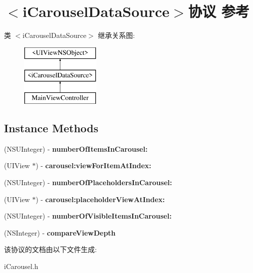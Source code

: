 \hypertarget{protocoli_carousel_data_source-p}{\section{$<$i\-Carousel\-Data\-Source$>$协议 参考}
\label{protocoli_carousel_data_source-p}
}
类 $<$i\-Carousel\-Data\-Source$>$ 继承关系图\-:\begin{figure}[H]
\begin{center}
\leavevmode
\includegraphics[height=3.000000cm]{protocoli_carousel_data_source-p}
\end{center}
\end{figure}
\subsection*{Instance Methods}
\begin{DoxyCompactItemize}
\item 
\hypertarget{protocoli_carousel_data_source-p_a2122722fbd3c539fc48607c66e21a1c7}{(N\-S\-U\-Integer) -\/ {\bfseries number\-Of\-Items\-In\-Carousel\-:}}\label{protocoli_carousel_data_source-p_a2122722fbd3c539fc48607c66e21a1c7}

\item 
\hypertarget{protocoli_carousel_data_source-p_a27d1dff4545a31eca95039fca4df4fd4}{(U\-I\-View $\ast$) -\/ {\bfseries carousel\-:view\-For\-Item\-At\-Index\-:}}\label{protocoli_carousel_data_source-p_a27d1dff4545a31eca95039fca4df4fd4}

\item 
\hypertarget{protocoli_carousel_data_source-p_a88190ba29b4d6e7985a1f6feda1e38bf}{(N\-S\-U\-Integer) -\/ {\bfseries number\-Of\-Placeholders\-In\-Carousel\-:}}\label{protocoli_carousel_data_source-p_a88190ba29b4d6e7985a1f6feda1e38bf}

\item 
\hypertarget{protocoli_carousel_data_source-p_ad619c9ca220d95c8597ee368c484edae}{(U\-I\-View $\ast$) -\/ {\bfseries carousel\-:placeholder\-View\-At\-Index\-:}}\label{protocoli_carousel_data_source-p_ad619c9ca220d95c8597ee368c484edae}

\item 
\hypertarget{protocoli_carousel_data_source-p_a4aab1076fadd9ab711bf497e08dfc0f8}{(N\-S\-U\-Integer) -\/ {\bfseries number\-Of\-Visible\-Items\-In\-Carousel\-:}}\label{protocoli_carousel_data_source-p_a4aab1076fadd9ab711bf497e08dfc0f8}

\item 
\hypertarget{protocoli_carousel_data_source-p_a6a949d0a49dcd57a6f383d1b8303178e}{(N\-S\-Integer) -\/ {\bfseries compare\-View\-Depth}}\label{protocoli_carousel_data_source-p_a6a949d0a49dcd57a6f383d1b8303178e}

\end{DoxyCompactItemize}


该协议的文档由以下文件生成\-:\begin{DoxyCompactItemize}
\item 
i\-Carousel.\-h\end{DoxyCompactItemize}
